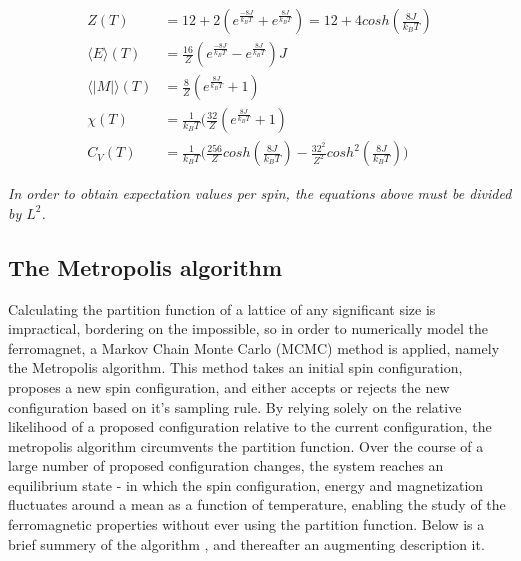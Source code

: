 \documentclass[%
oneside,                 %
final,                   %
10pt]{article}
\begin{document}
\begin{align}
Z(T)&=12+2(e^{\frac{-8J}{k_B T}}+e^{\frac{8J}{k_B T}})=12+4 cosh(\frac{8J}{k_B T}) \label{eq:Z(T)}\\
\langle E \rangle (T)&= \frac{16}{Z}( e^{\frac{-8J}{k_B T}} -e^{\frac{8J}{k_B T}})J \\
\langle |M| \rangle (T)&=\frac{8}{Z}(e^{\frac{8J}{k_B T}}+1) \\
\chi (T)&=\frac{1}{k_BT}(\frac{32}{Z}(e^{\frac{8J}{k_B T}} +1)\\
C_V (T)&=\frac{1}{k_BT} \big( \frac{256}{Z} cosh(\frac{8J}{k_B T}) -\frac{32^2}{Z^2}cosh^2(\frac{8J}{k_B T})\big) \label{eq:C_v(T)}
\end{align} 

\textit{In order to obtain expectation values per spin, the equations above must be divided by $L^2$.}


\subsection{The Metropolis algorithm}
\label{SS:MCMCmethod}
Calculating the partition function of a lattice of any significant size is impractical, bordering on the impossible, so in order to numerically model the ferromagnet, a Markov Chain Monte Carlo (MCMC) method is applied, namely the Metropolis algorithm. This method takes an initial spin configuration, proposes a new spin configuration, and either accepts or rejects the new configuration based on it's sampling rule. By relying solely on the relative likelihood of a proposed configuration relative to the current configuration, the metropolis algorithm circumvents the partition function. Over the course of a large number of proposed configuration changes, the system reaches an equilibrium state - in which the spin configuration, energy and magnetization fluctuates around a mean as a function of temperature, enabling the study of the ferromagnetic properties without ever using the partition function. Below is a brief summery of the algorithm \cite{HJ-SP}, and thereafter an augmenting description it. 
\end{document}
